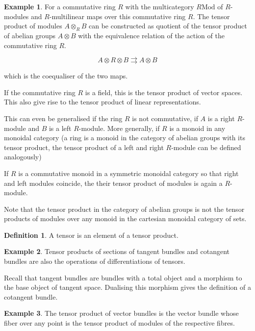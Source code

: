 \documentclass[10pt]{article}
\theoremstyle{plain}%
\theoremstyle{definition}
\newtheorem{definition}{Definition}[section]
\newtheorem{example}{Example}[section]
\theoremstyle{remark}
\begin{document}
\begin{example}
	For a commutative ring $R$ with the multicategory $R\mathrm{Mod}$ of $R$-modules and $R$-multilinear maps over this commutative ring $R$. The tensor product of modules $A \otimes_R B$ can be constructed as quotient of the tensor product of abelian groups $A \otimes B$ with the equivalence relation of the action of the commutative ring $R$.

	\begin{equation}
		A \otimes R \otimes B \rightrightarrows A \otimes B
	\end{equation}

	which is the coequaliser of the two maps.

	If the commutative ring $R$ is a field, this is the tensor product of vector spaces. This also give rise to the tensor product of linear representations.

	This can even be generalised if the ring $R$ is not commutative, if $A$ is a right $R$-module and $B$ is a left $R$-module. More generally, if $R$ is a monoid in any monoidal category (a ring is a monoid in the category of abelian groups with its tensor product, the tensor product of a left and right $R$-module can be defined analogously)

	If $R$ is a commutative monoid in a symmetric monoidal category so that right and left modules coincide, the their tensor product of modules is again a $R$-module.

	Note that the tensor product in the category of abelian groups is not the tensor products of modules over any monoid in the cartesian monoidal category of sets.
\end{example}

\begin{definition}
	A tensor is an element of a tensor product.
\end{definition}

\begin{example}
	Tensor products of sections of tangent bundles and cotangent bundles are also the operations of differentiations of tensors.

	Recall that tangent bundles are bundles with a total object and a morphism to the base object of tangent space. Dualising this morphism gives the definition of a cotangent bundle.
\end{example}

\begin{example}
	The tensor product of vector bundles is the vector bundle whose fiber over any point is the tensor product of modules of the respective fibres.
\end{example}
\end{document}
